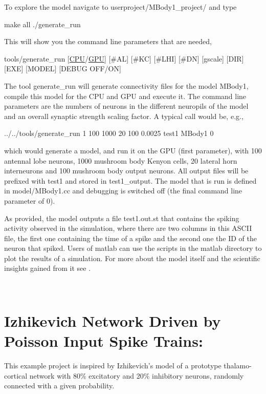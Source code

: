 To explore the model navigate to {\ttfamily userproject/\+M\+Body1\+\_\+project/} and type 
\begin{DoxyCode}
make all
./generate\_run 
\end{DoxyCode}
 This will show you the command line parameters that are needed, 
\begin{DoxyCode}
tools/generate\_run [\hyperlink{modelSpec_8h_ad703205f9a4d4bb6af9c25257c23ce6d}{CPU}/\hyperlink{modelSpec_8h_a39cb9803524b6f3b783344b2f89867b4}{GPU}] [#AL] [#KC] [#LHI] [#DN] [gscale] [DIR] [EXE] [MODEL] [DEBUG OFF/ON]
\end{DoxyCode}
 The tool generate\+\_\+run will generate connectivity files for the model {\ttfamily M\+Body1}, compile this model for the C\+P\+U and G\+P\+U and execute it. The command line parameters are the numbers of neurons in the different neuropils of the model and an overall synaptic strength scaling factor. A typical call would be, e.\+g., 
\begin{DoxyCode}
../../tools/generate\_run 1 100 1000 20 100 0.0025 test1 MBody1 0
\end{DoxyCode}
 which would generate a model, and run it on the G\+P\+U (first parameter), with 100 antennal lobe neurons, 1000 mushroom body Kenyon cells, 20 lateral horn interneurons and 100 mushroom body output neurons. All output files will be prefixed with {\ttfamily test1} and stored in {\ttfamily test1\+\_\+output}. The model that is run is defined in {\ttfamily model/\+M\+Body1.\+cc} and debugging is switched off (the final command line parameter of 0).

As provided, the model outputs a file {\ttfamily test1.\+out.\+st} that contains the spiking activity observed in the simulation, where there are two columns in this A\+S\+C\+I\+I file, the first one containing the time of a spike and the second one the I\+D of the neuron that spiked. Users of matlab can use the scripts in the {\ttfamily matlab} directory to plot the results of a simulation. For more about the model itself and the scientific insights gained from it see \cite{nowotny2005self}.

~\newline
\hypertarget{Examples_sec_ex_poissonizh}{}\section{Izhikevich Network Driven by Poisson Input Spike Trains\+:}\label{Examples_sec_ex_poissonizh}
This example project is inspired by Izhikevich's model of a prototype thalamo-\/cortical network \cite{izhikevich2003simple} with 80\% excitatory and 20\% inhibitory neurons, randomly connected with a given probability.

